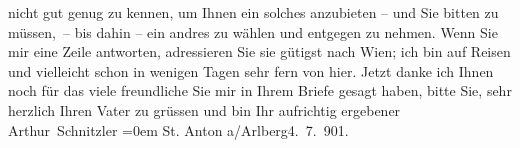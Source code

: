 \begin{ledgroupsized}[t]{13cm}
               nicht gut genug zu kennen, um Ihnen ein solches anzubieten – und Sie bitten zu
               müssen, – bis dahin – ein andres zu wählen und entgegen zu nehmen.\pend
           \pstart
           Wenn Sie mir eine Zeile antworten, adressieren Sie sie gütigst nach Wien; ich bin auf Reisen und vielleicht schon in wenigen Tagen
               sehr fern von hier.\pend
           \pstart
           Jetzt danke ich Ihnen noch für das viele freundliche \label{T_L01141-1v}\label{T_L01141-1h} Sie mir in Ihrem Briefe gesagt haben, bitte Sie,
               sehr herzlich Ihren Vater zu
               grüssen und bin\pend
           \pstart
           Ihr aufrichtig ergebener{\\[\baselineskip]}\spacefill\mbox{Arthur Schnitzler}\pend
           \leftskip=0em{}\pstart
           St. Anton a/Arlberg4. 7. 901.\pend
           
         
         \endnumbering{}\end{ledgroupsized}  \newcommand{\dateiname}{L01141}\newcommand{\titel}{Arthur Schnitzler an Edith Brandes, 4. 7. 1901}\newcommand{\editorInnen}{Martin Anton Müller und Gerd-Hermann Susen}
      